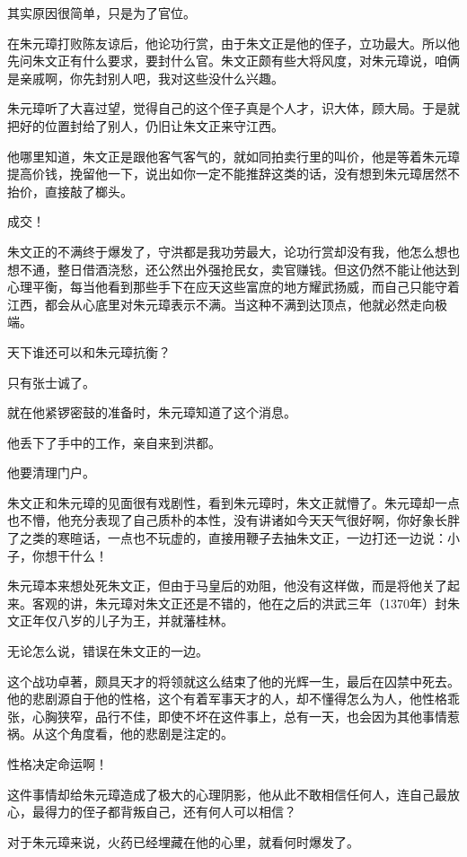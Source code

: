 \begin{multicols}{\theparacolNo}
		其实原因很简单，只是为了官位。

		在朱元璋打败陈友谅后，他论功行赏，由于朱文正是他的侄子，立功最大。所以他先问朱文正有什么要求，要封什么官。朱文正颇有些大将风度，对朱元璋说，咱俩是亲戚啊，你先封别人吧，我对这些没什么兴趣。

		朱元璋听了大喜过望，觉得自己的这个侄子真是个人才，识大体，顾大局。于是就把好的位置封给了别人，仍旧让朱文正来守江西。

		他哪里知道，朱文正是跟他客气客气的，就如同拍卖行里的叫价，他是等着朱元璋提高价钱，挽留他一下，说出如你一定不能推辞这类的话，没有想到朱元璋居然不抬价，直接敲了榔头。

		成交！

		朱文正的不满终于爆发了，守洪都是我功劳最大，论功行赏却没有我，他怎么想也想不通，整日借酒浇愁，还公然出外强抢民女，卖官赚钱。但这仍然不能让他达到心理平衡，每当他看到那些手下在应天这些富庶的地方耀武扬威，而自己只能守着江西，都会从心底里对朱元璋表示不满。当这种不满到达顶点，他就必然走向极端。

		天下谁还可以和朱元璋抗衡？

		只有张士诚了。

		就在他紧锣密鼓的准备时，朱元璋知道了这个消息。

		他丢下了手中的工作，亲自来到洪都。

		他要清理门户。

		朱文正和朱元璋的见面很有戏剧性，看到朱元璋时，朱文正就懵了。朱元璋却一点也不懵，他充分表现了自己质朴的本性，没有讲诸如今天天气很好啊，你好象长胖了之类的寒暄话，一点也不玩虚的，直接用鞭子去抽朱文正，一边打还一边说：小子，你想干什么！

		朱元璋本来想处死朱文正，但由于马皇后的劝阻，他没有这样做，而是将他关了起来。客观的讲，朱元璋对朱文正还是不错的，他在之后的洪武三年（1370年）封朱文正年仅八岁的儿子为王，并就藩桂林。

		无论怎么说，错误在朱文正的一边。

		这个战功卓著，颇具天才的将领就这么结束了他的光辉一生，最后在囚禁中死去。他的悲剧源自于他的性格，这个有着军事天才的人，却不懂得怎么为人，他性格乖张，心胸狭窄，品行不佳，即使不坏在这件事上，总有一天，也会因为其他事情惹祸。从这个角度看，他的悲剧是注定的。

		性格决定命运啊！

		这件事情却给朱元璋造成了极大的心理阴影，他从此不敢相信任何人，连自己最放心，最得力的侄子都背叛自己，还有何人可以相信？

		对于朱元璋来说，火药已经埋藏在他的心里，就看何时爆发了。


\end{multicols}
